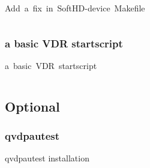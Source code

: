\documentclass[11pt, a4paper,ngerman]{article}
\begin{document}
\begin{mintedbox}[breakable=true,
 bottomrule=0.5mm,
 width=\paperwidth-3cm,
 boxsep=1mm, 
 enhanced=true,
 colframe = monoblack,
 drop fuzzy shadow,
 colback = black
 ]{Add\ a\ fix\ in\ SoftHD-device\ Makefile}%
 

     \inputminted[firstline=34,lastline=37, 
     linenos=true, framesep=2mm, mathescape, numbersep=5pt,tabsize=4,%
]{bash}{includes/software.sh}%

\end{mintedbox}%
\vspace{0.2cm}

\subsubsection{a basic VDR startscript}

\begin{mintedbox}[breakable=true,
 bottomrule=0.5mm,
 width=\paperwidth-3cm,
 boxsep=1mm, 
 enhanced=true,
 colframe = monoblack,
 drop fuzzy shadow,
 colback = black
 ]{a\ basic\ VDR\ startscript}%
 

     \inputminted[firstline=0,lastline=35, 
     linenos=true, framesep=2mm, mathescape, numbersep=5pt,tabsize=4,%
]{bash}{includes/vdr-startscript.sh}%

\end{mintedbox}%

\newpage %

\subsection{Optional}

\subsubsection{qvdpautest}

\begin{mintedbox}[breakable=true,
 bottomrule=0.5mm,
 width=\paperwidth-3cm,
 boxsep=1mm, 
 enhanced=true,
 colframe = monoblack,
 drop fuzzy shadow,
 colback = black
 ]{qvdpautest installation}%
 

     \inputminted[firstline=3,lastline=32, 
     linenos=true, framesep=2mm, mathescape, numbersep=5pt,tabsize=4,%
]{bash}{includes/qvdpau.sh}%

\end{mintedbox}%
\vspace{0.2cm}
\end{document}
